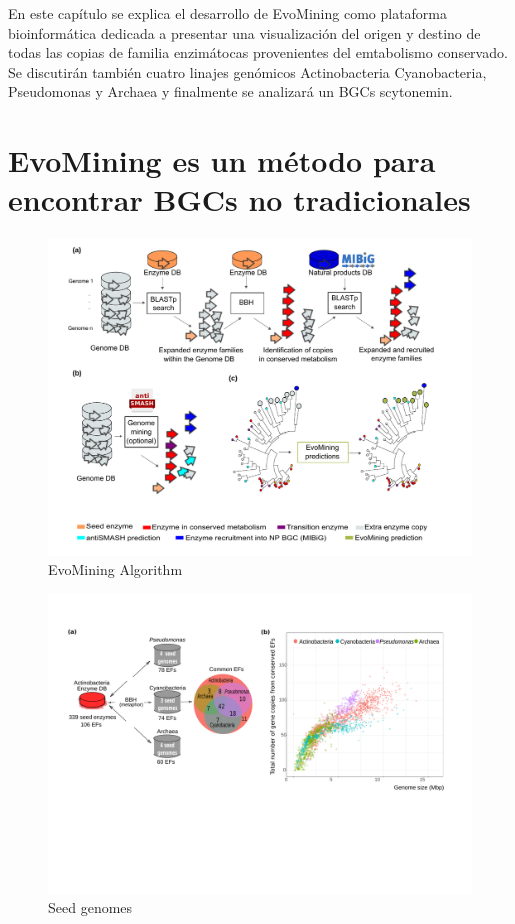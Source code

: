 \documentclass[12pt,twoside]{reedthesis}
\begin{document}
  En este capítulo se explica el desarrollo de EvoMining como plataforma
  bioinformática dedicada a presentar una visualización del origen y
  destino de todas las copias de familia enzimátocas provenientes del
  emtabolismo conservado. Se discutirán también cuatro linajes genómicos
  Actinobacteria Cyanobacteria, Pseudomonas y Archaea y finalmente se
  analizará un BGCs scytonemin.
  
  \section{EvoMining es un método para encontrar BGCs no
  tradicionales}\label{evomining-es-un-metodo-para-encontrar-bgcs-no-tradicionales}
  
  \begin{figure}[h!tbp]
  \centering
  \includegraphics[angle = 0,scale = 1]{chapter2/FigurasPaper/Figure1.pdf}
  \caption[EvoMining Algorithm]{\normalsize{EvoMining Algorithm}}
  \label{fig:EvoMining Algorithms}
  \end{figure}
  
  \begin{figure}[h!tbp]
  \centering
  \includegraphics[angle = 0,scale = 1]{chapter2/FigurasPaper/Figure2.pdf}
  \caption[Seed genomes]{\normalsize{Seed genomes}}
  \label{fig:Seed genomes}
  \end{figure}
  
\end{document}

